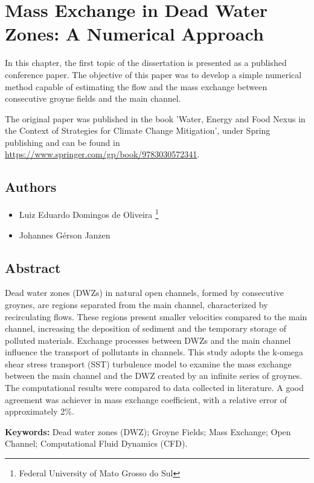 \chapter{Mass Exchange in Dead Water Zones: A Numerical Approach}
\label{chap:art1}
In this chapter, the first topic of the dissertation is presented as a published conference paper. The objective of this paper was to develop a simple numerical method capable of estimating the flow and the mass exchange between consecutive groyne fields and the main channel.

The original paper was published in the book 'Water, Energy and Food Nexus in the Context of Strategies for Climate Change Mitigation', under Spring publishing and can be found in \url{https://www.springer.com/gp/book/9783030572341}.
\section*{Authors}
\begin{itemize}
    \item Luiz Eduardo Domingos de Oliveira \footnote[1]{Federal University of Mato Grosso do Sul}
    \item Johannes Gérson Janzen \footnotemark[1]
\end{itemize}
\section*{Abstract}
Dead water zones (DWZs) in natural open channels, formed by consecutive groynes, are regions separated from the main channel, characterized by recirculating flows. These regions present smaller velocities compared to the main channel, increasing the deposition of sediment and the temporary storage of polluted materials. Exchange processes between DWZs and the main channel influence the transport of pollutants in channels. This study adopts the k-omega shear stress transport (SST) turbulence model to examine the mass exchange between the main channel and the DWZ created by an infinite series of groynes. The computational results were compared to data collected in literature. A good agreement was achiever in mass exchange coefficient, with a relative error of approximately 2\%.

\noindent\textbf{Keywords:} Dead water zones (DWZ); Groyne Fields; Mass Exchange; Open Channel; Computational Fluid Dynamics (CFD).

